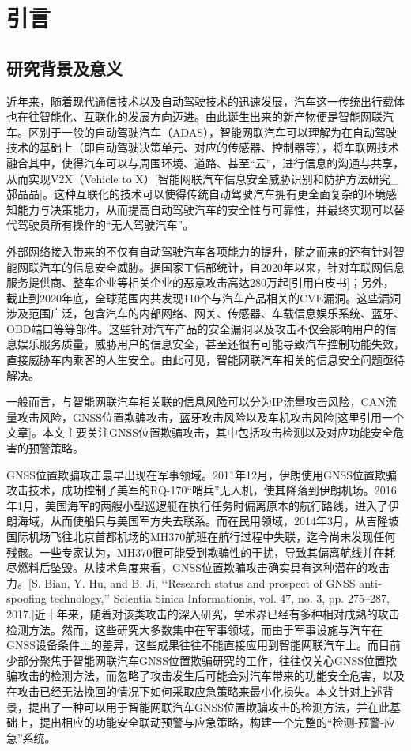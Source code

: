 \section{引言}

\subsection{研究背景及意义}
近年来，随着现代通信技术以及自动驾驶技术的迅速发展，汽车这一传统出行载体也在往智能化、互联化的发展方向迈进。由此诞生出来的新产物便是智能网联汽车。区别于一般的自动驾驶汽车（ADAS），智能网联汽车可以理解为在自动驾驶技术的基础上（即自动驾驶决策单元、对应的传感器、控制器等），将车联网技术融合其中，使得汽车可以与周围环境、道路、甚至“云”，进行信息的沟通与共享，从而实现V2X（Vehicle to X）[智能网联汽车信息安全威胁识别和防护方法研究\_郝晶晶]。这种互联化的技术可以使得传统自动驾驶汽车拥有更全面复杂的环境感知能力与决策能力，从而提高自动驾驶汽车的安全性与可靠性，并最终实现可以替代驾驶员所有操作的“无人驾驶汽车”。

外部网络接入带来的不仅有自动驾驶汽车各项能力的提升，随之而来的还有针对智能网联汽车的信息安全威胁。据国家工信部统计，自2020年以来，针对车联网信息服务提供商、整车企业等相关企业的恶意攻击高达280万起[引用白皮书]；另外，截止到2020年底，全球范围内共发现110个与汽车产品相关的CVE漏洞。这些漏洞涉及范围广泛，包含汽车的内部网络、网关、传感器、车载信息娱乐系统、蓝牙、OBD端口等等部件。这些针对汽车产品的安全漏洞以及攻击不仅会影响用户的信息娱乐服务质量，威胁用户的信息安全，甚至还很有可能导致汽车控制功能失效，直接威胁车内乘客的人生安全。由此可见，智能网联汽车相关的信息安全问题亟待解决。

一般而言，与智能网联汽车相关联的信息风险可以分为IP流量攻击风险，CAN流量攻击风险，GNSS位置欺骗攻击，蓝牙攻击风险以及车机攻击风险[这里引用一个文章]。本文主要关注GNSS位置欺骗攻击，其中包括攻击检测以及对应功能安全危害的预警策略。

GNSS位置欺骗攻击最早出现在军事领域。2011年12月，伊朗使用GNSS位置欺骗攻击技术，成功控制了美军的RQ-170“哨兵”无人机，使其降落到伊朗机场。2016年1月，美国海军的两艘小型巡逻艇在执行任务时偏离原本的航行路线，进入了伊朗海域，从而使船只与美国军方失去联系。而在民用领域，2014年3月，从吉隆坡国际机场飞往北京首都机场的MH370航班在航行过程中失联，迄今尚未发现任何残骸。一些专家认为，MH370很可能受到欺骗性的干扰，导致其偏离航线并在耗尽燃料后坠毁。从技术角度来看，GNSS位置欺骗攻击确实具有这种潜在的攻击力。[S. Bian, Y. Hu, and B. Ji, ‘‘Research status and prospect of GNSS anti-spoofing technology,’’ Scientia Sinica Informationis, vol. 47, no. 3, pp. 275–287, 2017.]近十年来，随着对该类攻击的深入研究，学术界已经有多种相对成熟的攻击检测方法。然而，这些研究大多数集中在军事领域，而由于军事设施与汽车在GNSS设备条件上的差异，这些成果往往不能直接应用到智能网联汽车上。而目前少部分聚焦于智能网联汽车GNSS位置欺骗研究的工作，往往仅关心GNSS位置欺骗攻击的检测方法，而忽略了攻击发生后可能会对汽车带来的功能安全危害，以及在攻击已经无法挽回的情况下如何采取应急策略来最小化损失。本文针对上述背景，提出了一种可以用于智能网联汽车GNSS位置欺骗攻击的检测方法，并在此基础上，提出相应的功能安全联动预警与应急策略，构建一个完整的“检测-预警-应急”系统。

